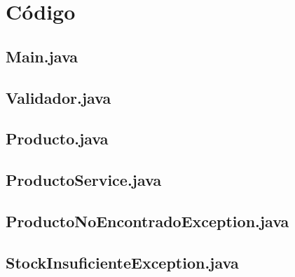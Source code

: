 \documentclass[12pt,a4paper]{article}
\begin{document}
\section{Código}
\subsection{Main.java}


\subsection{Validador.java}


\subsection{Producto.java}


\subsection{ProductoService.java}



\subsection{ProductoNoEncontradoException.java}


\subsection{StockInsuficienteException.java}

\end{document}
